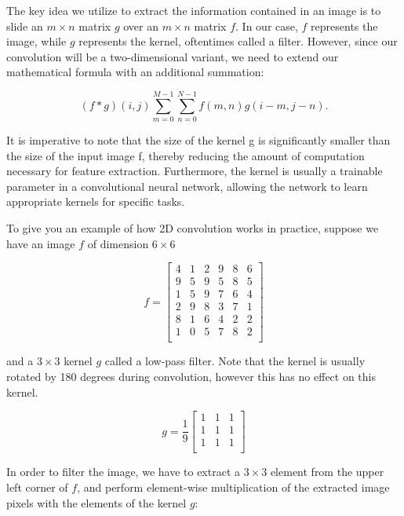 \documentclass[%
oneside,                 %
final,                   %
10pt]{article}
\begin{document}
The key idea we utilize to extract the information contained in an
image is to slide an $m \times n$ matrix $g$ over an $m \times n$
matrix $f$. In our case, $f$ represents the image, while $g$
represents the kernel, oftentimes called a filter. However, since our
convolution will be a two-dimensional variant, we need to extend our
mathematical formula with an additional summation:

\[
(f \ast g)(i, j)\sum_{m=0}^{M-1}\sum_{n=0}^{N-1} f(m,n) g(i-m, j-n).
\]

It is imperative to note that the size of the kernel g is
significantly smaller than the size of the input image f, thereby
reducing the amount of computation necessary for feature
extraction. Furthermore, the kernel is usually a trainable parameter
in a convolutional neural network, allowing the network to learn
appropriate kernels for specific tasks.

To give you an example of how 2D convolution works in practice,
suppose we have an image $f$ of dimension $6 \times 6$

\[
f = \begin{bmatrix}
4 & 1 & 2 & 9 & 8 & 6 \\
9 & 5 & 9 & 5 & 8 & 5 \\
1 & 5 & 9 & 7 & 6 & 4 \\
2 & 9 & 8 & 3 & 7 & 1 \\
8 & 1 & 6 & 4 & 2 & 2 \\
1 & 0 & 5 & 7 & 8 & 2 \\
\end{bmatrix}
\]

and a $3 \times 3$ kernel $g$ called a low-pass filter. Note that the
kernel is usually rotated by 180 degrees during convolution, however
this has no effect on this kernel.

\[
g = \frac{1}{9}
\begin{bmatrix}
1 & 1 & 1 \\
1 & 1 & 1 \\
1 & 1 & 1 \\
\end{bmatrix}
\]

In order to filter the image, we have to extract a $3 \times 3$
element from the upper left corner of $f$, and perform element-wise
multiplication of the extracted image pixels with the elements of the
kernel $g$:
\end{document}
